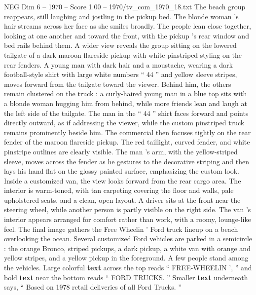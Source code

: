 \begin{textsample}{NEG Dim 6 – 1970 – Score 1.00 – 1970/tv\_com\_1970\_18.txt}
The beach group reappears, still laughing and jostling in the pickup bed.
The blonde woman ’s hair streams across her face as she smiles broadly.
The people lean close together, looking at one another and toward the front, with the pickup ’s rear window and bed rails behind them.
A wider view reveals the group sitting on the lowered tailgate of a dark maroon flareside pickup with white pinstriped styling on the rear fenders.
A young man with dark hair and a moustache, wearing a dark football-style shirt with large white numbers “ 44 ” and yellow sleeve stripes, moves forward from the tailgate toward the viewer.
Behind him, the others remain clustered on the truck : a curly-haired young man in a blue top sits with a blonde woman hugging him from behind, while more friends lean and laugh at the left side of the tailgate.
The man in the “ 44 ” shirt faces forward and points directly outward, as if addressing the viewer, while the custom pinstriped truck remains prominently beside him.
The commercial then focuses tightly on the rear fender of the maroon flareside pickup.
The red taillight, curved fender, and white pinstripe outlines are clearly visible.
The man ’s arm, with the yellow-striped sleeve, moves across the fender as he gestures to the decorative striping and then lays his hand flat on the glossy painted surface, emphasizing the custom look.
Inside a customized van, the view looks forward from the rear cargo area.
The interior is warm-toned, with tan carpeting covering the floor and walls, pale upholstered seats, and a clean, open layout.
A driver sits at the front near the steering wheel, while another person is partly visible on the right side.
The van ’s interior appears arranged for comfort rather than work, with a roomy, lounge-like feel.
The final image gathers the Free Wheelin ’ Ford truck lineup on a beach overlooking the ocean.
Several customized Ford vehicles are parked in a semicircle : the orange Bronco, striped pickups, a dark pickup, a white van with orange and yellow stripes, and a yellow pickup in the foreground.
A few people stand among the vehicles.
Large colorful \textbf{text} across the top reads “ FREE-WHEELIN ’, ” and bold \textbf{text} near the bottom reads “ FORD TRUCKS. ” Smaller \textbf{text} underneath says, “ Based on 1978 retail deliveries of all Ford Trucks. ”

\end{textsample}
